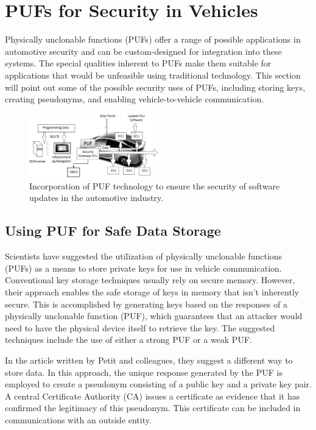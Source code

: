 \documentclass[conference]{IEEEtran}
\begin{document}
\section{PUFs for Security in Vehicles }
Physically unclonable functions (PUFs) offer a range of possible applications in automotive security and can be custom-designed for integration into these systems. \cite{labrado2018design}
The special qualities inherent to PUFs make them suitable for applications that would be unfeasible using traditional technology. This section will point out some of the possible security uses of PUFs, including storing keys, creating pseudonyms, and enabling vehicle-to-vehicle communication. 
\begin{figure}[htbp]
\centerline{\includegraphics[width=0.5\textwidth]{PUF.eps}}
\caption{Incorporation of PUF technology to ensure the security of software updates in the automotive industry.\cite{hiroyuki2015puft}}
\label{fig}
\end{figure}
\subsection{Using PUF for Safe Data Storage}
 Scientists have suggested the utilization of physically unclonable functions (PUFs) as a means to store private keys for use in vehicle communication. \cite{feiri2013efficient}
 Conventional key storage techniques usually rely on secure memory. However, their approach enables the safe storage of keys in memory that isn't inherently secure. This is accomplished by generating keys based on the responses of a physically unclonable function (PUF), which guarantees that an attacker would need to have the physical device itself to retrieve the key. \cite{labrado2019hardware}
 The suggested techniques include the use of either a strong PUF or a weak PUF. \cite{feiri2013efficient}
 \par In the article written by Petit and colleagues, they suggest a different way to store data. \cite{petit2012potential}
 In this approach, the unique response generated by the PUF is employed to create a pseudonym consisting of a public key and a private key pair. A central Certificate Authority (CA) issues a certificate as evidence that it has confirmed the legitimacy of this pseudonym. This certificate can be included in communications with an outside entity. \cite{labrado2019hardware}
\end{document}

